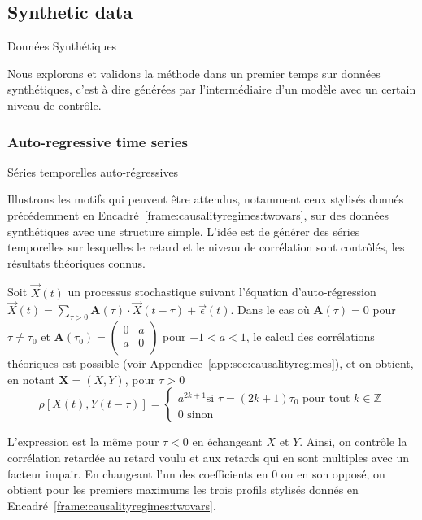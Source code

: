 


\subsection{Synthetic data}{Données Synthétiques}

Nous explorons et validons la méthode dans un premier temps sur données synthétiques, c'est à dire générées par l'intermédiaire d'un modèle avec un certain niveau de contrôle.


\subsubsection{Auto-regressive time series}{Séries temporelles auto-régressives}

Illustrons les motifs qui peuvent être attendus, notamment ceux stylisés donnés précédemment en Encadré~\ref{frame:causalityregimes:twovars}, sur des données synthétiques avec une structure simple. L'idée est de générer des séries temporelles sur lesquelles le retard et le niveau de corrélation sont contrôlés, les résultats théoriques connus.


Soit $\vec{X}(t)$ un processus stochastique suivant l'équation d'auto-régression $\vec{X}(t) = \sum_{\tau > 0} \mathbf{A}(\tau) \cdot \vec{X}(t - \tau ) + \vec{\epsilon}(t)$. Dans le cas où $\mathbf{A}(\tau) = 0$ pour $\tau \neq \tau_0$ et $\mathbf{A}(\tau_0) = \left( {\begin{array}{cc} 0 & a \\ a & 0 \\ \end{array}} \right)$ pour $-1<a<1$, le calcul des corrélations théoriques est possible (voir Appendice~\ref{app:sec:causalityregimes}), et on obtient, en notant $\mathbf{X} = (X,Y)$, pour $\tau > 0$
\[
\rho\left[X(t),Y(t-\tau)\right] = \begin{cases}
	a^{2k+1} \textrm{si } \tau = (2k+1)\tau_0\textrm{ pour tout }k\in \mathbb{Z} \\
	0 \textrm{ sinon} 
\end{cases}
\]

L'expression est la même pour $\tau<0$ en échangeant $X$ et $Y$. Ainsi, on contrôle la corrélation retardée au retard voulu et aux retards qui en sont multiples avec un facteur impair. En changeant l'un des coefficients en 0 ou en son opposé, on obtient pour les premiers maximums les trois profils stylisés donnés en Encadré~\ref{frame:causalityregimes:twovars}.


